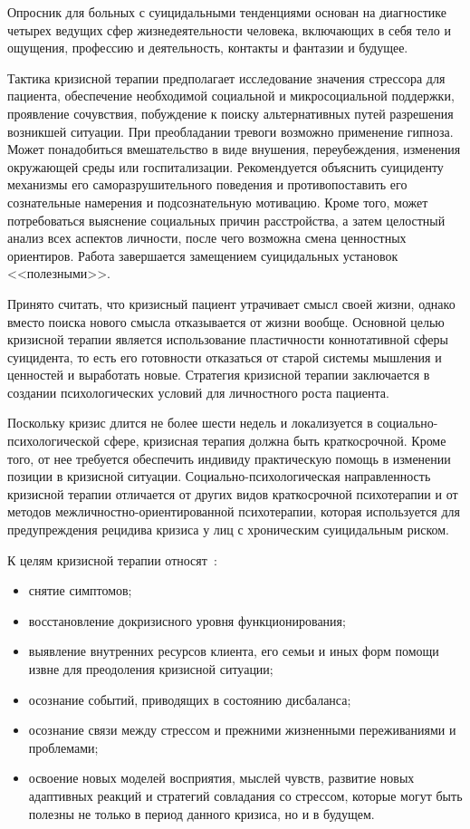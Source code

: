 Опросник для больных с суицидальными тенденциями основан на диагностике четырех ведущих сфер жизнедеятельности человека, включающих в себя тело и ощущения, профессию и деятельность, контакты и фантазии и будущее.~\cite{starsen}

Тактика кризисной терапии предполагает исследование значения стрессора для пациента, обеспечение необходимой социальной и микросоциальной поддержки, проявление сочувствия, побуждение к поиску альтернативных путей разрешения возникшей ситуации. При преобладании тревоги возможно применение гипноза. Может понадобиться вмешательство в виде внушения, переубеждения, изменения окружающей среды или госпитализации. Рекомендуется объяснить суициденту механизмы его саморазрушительного поведения и противопоставить его сознательные намерения и подсознательную мотивацию. Кроме того, может потребоваться выяснение социальных причин расстройства, а затем целостный анализ всех аспектов личности, после чего возможна смена ценностных ориентиров. Работа завершается замещением суицидальных установок <<полезными>>.~\cite{starsen}

Принято считать, что кризисный пациент утрачивает смысл своей жизни, однако вместо поиска нового смысла отказывается от жизни вообще. Основной целью кризисной терапии является использование пластичности коннотативной сферы суицидента, то есть его готовности отказаться от старой системы мышления и ценностей и выработать новые. Стратегия кризисной терапии заключается в создании психологических условий для личностного роста пациента.~\cite{starsen}

Поскольку кризис длится не более шести недель и локализуется в социально-психологической сфере, кризисная терапия должна быть краткосрочной. Кроме того, от нее требуется обеспечить индивиду практическую помощь в изменении позиции в кризисной ситуации. Социально-психологическая направленность кризисной терапии отличается от других видов краткосрочной психотерапии и от методов межличностно-ориентированной психотерапии, которая используется для предупреждения рецидива кризиса у лиц с хроническим суицидальным риском.~\cite{starsen}

К целям кризисной терапии относят~\cite{rappo}:

\begin{itemize}
	\item снятие симптомов;
	\item восстановление докризисного уровня функционирования;
	\item выявление внутренних ресурсов клиента, его семьи и иных форм помощи извне для преодоления кризисной ситуации;
	\item осознание событий, приводящих в состоянию дисбаланса;
	\item осознание связи между стрессом и прежними жизненными переживаниями и проблемами;
	\item освоение новых моделей восприятия, мыслей чувств, развитие новых адаптивных реакций и стратегий совладания со стрессом, которые могут быть полезны не только в период данного кризиса, но и в будущем.
\end{itemize}

